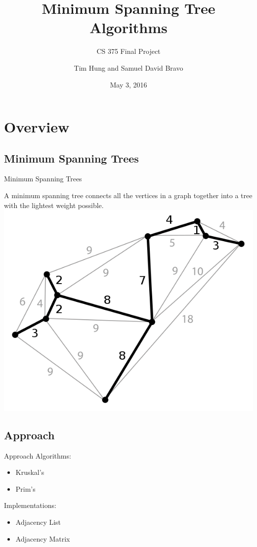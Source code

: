 \documentclass{beamer}
\title{Minimum Spanning Tree Algorithms}
\subtitle{CS 375 Final Project}
\author{Tim Hung and Samuel David Bravo}
\institute{Binghamton University}
\date{May 3, 2016}
\begin{document}
\frame{\titlepage}
\section{Overview}\frame{\sectionpage}

\subsection{Minimum Spanning Trees}
\begin{frame}{Minimum Spanning Trees}
    \begin{center}
    A minimum spanning tree connects all the vertices in a graph together into
    a tree with the lightest weight possible.
    \includegraphics[scale=0.3]{mst}
    \end{center}
\end{frame}

\subsection{Approach}
\begin{frame}{Approach}
    Algorithms:

        \begin{itemize}
        \item Kruskal's
        \item Prim's
        \end{itemize}

    Implementations:

        \begin{itemize}
        \item Adjacency List
        \item Adjacency Matrix
        \end{itemize}
\end{frame}
\end{document}
